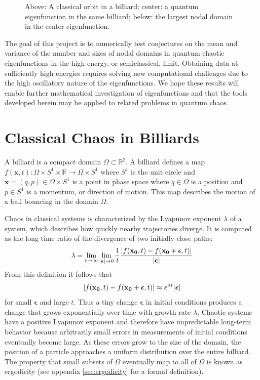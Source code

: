 \documentclass{report}
\newcommand{\xx}[0]{\mathbf{x}}
\begin{document}
\begin{figure}
\begin{center}
    \caption{Above: A classical orbit in a billiard; center: a quantum eigenfunction in the same billiard; below: the largest nodal domain in the center eigenfunction.}
    \label{fig:classical_vs_quantum}
  \end{center}
\end{figure}

The goal of this project is to numerically test conjectures on the mean and variance of the number and sizes of nodal domains in quantum chaotic eigenfunctions in the high energy, or semiclassical, limit. Obtaining data at sufficiently high energies requires solving new computational challenges due to the high oscillatory nature of the eigenfunctions. We hope these results will enable further mathematical investigation of eigenfunctions and that the tools developed herein may be applied to related problems in quantum chaos.

\section{Classical Chaos in Billiards}
\label{sec:classical}
A billiard is a compact domain $\Omega \subset \mathbb{R}^{2}$. A billiard defines a map $f(\xx, t): \Omega \times S^{1} \times \mathbb{R} \rightarrow \Omega \times S^{1}$ where $S^{1}$ is the unit circle and $\xx = (q, p) \in \Omega \times S^{1}$ is a point in phase space where $q \in \Omega$ is a position and $p \in S^{1}$ is a momentum, or direction of motion. This map describes the motion of a ball bouncing in the domain $\Omega$.

Chaos in classical systems is characterized by the Lyapunov exponent $\lambda$ of a system, which describes how quickly nearby trajectories diverge. It is computed as the long time ratio of the divergence of two initially close paths:
\[
\lambda = \lim_{t \to \infty} \lim_{\vert \boldsymbol\epsilon \vert \to 0} \frac{1}{t} \frac{\vert f({\bf x_{0}}, t) - f({\bf x_{0}} + \boldsymbol\epsilon, t) \vert}{\vert \boldsymbol\epsilon \vert}
\]
From this definition it follows that
\[
\vert f({\bf x_{0}}, t) - f({\bf x_{0}} + \boldsymbol\epsilon, t) \vert \approx e^{\lambda t} \vert \boldsymbol\epsilon \vert
\]
for small $\boldsymbol\epsilon$ and large $t$. Thus a tiny change $\boldsymbol\epsilon$ in initial conditions produces a change that grows exponentially over time with growth rate $\lambda$. Chaotic systems have a positive Lyapunov exponent and therefore have unpredictable long-term behavior because arbitrarily small errors in measurements of initial conditions eventually become large. As these errors grow to the size of the domain, the position of a particle approaches a uniform distribution over the entire billiard. The property that small subsets of $\Omega$ eventually map to all of $\Omega$ is known as ergodicity (see appendix \ref{sec:ergodicity} for a formal definition).
\end{document}
